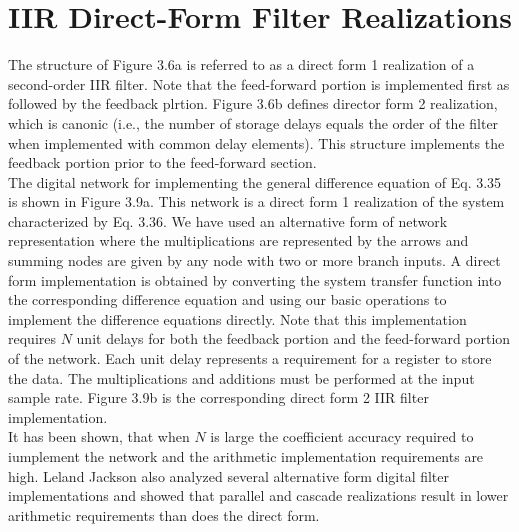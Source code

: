 \documentclass[11pt]{report}
\theoremstyle{example}
\begin{document}
\section{IIR Direct-Form Filter Realizations}
The structure of Figure 3.6a is referred to as a direct form 1 realization of a second-order IIR filter. Note that the feed-forward portion is implemented first as followed by the feedback plrtion. Figure 3.6b defines director form 2 realization, which is canonic (i.e., the number of storage delays equals the order of the filter when implemented with common delay elements). This structure implements the feedback portion prior to the feed-forward section.\\
The digital network for implementing the general difference equation of Eq. 3.35 is shown in Figure 3.9a. This network is a direct form 1 realization of the system characterized by Eq. 3.36. We have used an alternative form of network representation where the multiplications are represented by the arrows and summing nodes are given by any node with two or more branch inputs. A direct form implementation is obtained by converting the system transfer function into the corresponding difference equation and using our basic operations to implement the difference equations directly. Note that this implementation requires $N$ unit delays for both the feedback portion and the feed-forward portion of the network. Each unit delay represents a requirement for a register to store the data. The multiplications and additions must be performed at the input sample rate. Figure 3.9b is the corresponding direct form 2 IIR filter implementation.\\
It has been shown, that when $N$ is large the coefficient accuracy required to iumplement the network and the arithmetic implementation requirements are high. Leland Jackson also analyzed several alternative form digital filter implementations and showed that parallel and cascade realizations result in lower arithmetic requirements than does the direct form.
\end{document}
